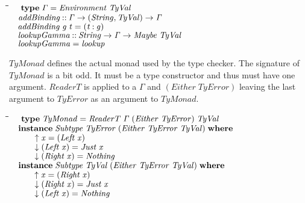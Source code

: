\documentclass[10pt]{article}
\newlength{\lwidth}\setlength{\lwidth}{4.5cm}
\newlength{\cwidth}\setlength{\cwidth}{8mm} %
\newcommand{\Conid}[1]{\mathit{#1}}
\newcommand{\Varid}[1]{\mathit{#1}}
\begin{document}
\begin{tabbing}
\qquad\=\hspace{\lwidth}\=\hspace{\cwidth}\=\+\kill
${\hskip1.00em\relax\mathbf{type}\;\Varid{\Gamma}\mathrel{=}\Conid{Environment}\;\Conid{TyVal}}$\\
${}$\\
${\hskip1.00em\relax\Varid{addBinding}\mathbin{::}\Varid{\Gamma}\to (\Conid{String},\Conid{TyVal})\to \Varid{\Gamma}}$\\
${\hskip1.00em\relax\Varid{addBinding}\;\Varid{g}\;\Varid{t}\mathrel{=}(\Varid{t}\mathbin{:}\Varid{g})}$\\
${}$\\
${\hskip1.00em\relax\Varid{lookupGamma}\mathbin{::}\Conid{String}\to \Varid{\Gamma}\to \Conid{Maybe}\;\Conid{TyVal}}$\\
${\hskip1.00em\relax\Varid{lookupGamma}\mathrel{=}\Varid{lookup}}$
\end{tabbing}
\ensuremath{\Conid{TyMonad}} defines the actual monad used by the type checker.  The
signature of \ensuremath{\Conid{TyMonad}} is a bit odd.  It must be a type constructor
and thus must have one argument.  \ensuremath{\Conid{ReaderT}} is applied to a \ensuremath{\Varid{\Gamma}}
and \ensuremath{(\Conid{Either}\;\Conid{TyError})} leaving the last argument to \ensuremath{\Conid{TyError}} as an
argument to \ensuremath{\Conid{TyMonad}}.

\begin{tabbing}
\qquad\=\hspace{\lwidth}\=\hspace{\cwidth}\=\+\kill
${\hskip1.00em\relax\mathbf{type}\;\Conid{TyMonad}\mathrel{=}\Conid{ReaderT}\;\Varid{\Gamma}\;(\Conid{Either}\;\Conid{TyError})\;\Conid{TyVal}}$\\
${}$\\
${\hskip1.00em\relax\mathbf{instance}\;\Conid{Subtype}\;\Conid{TyError}\;(\Conid{Either}\;\Conid{TyError}\;\Conid{TyVal})\;\mathbf{where}}$\\
${\hskip1.00em\relax\hskip2.00em\relax\Varid{\uparrow}\;\Varid{x}\mathrel{=}(\Conid{Left}\;\Varid{x})}$\\
${\hskip1.00em\relax\hskip2.00em\relax\Varid{\downarrow}\;(\Conid{Left}\;\Varid{x})\mathrel{=}\Conid{Just}\;\Varid{x}}$\\
${\hskip1.00em\relax\hskip2.00em\relax\Varid{\downarrow}\;(\Conid{Right}\;\Varid{x})\mathrel{=}\Conid{Nothing}}$\\
${}$\\
${\hskip1.00em\relax\mathbf{instance}\;\Conid{Subtype}\;\Conid{TyVal}\;(\Conid{Either}\;\Conid{TyError}\;\Conid{TyVal})\;\mathbf{where}}$\\
${\hskip1.00em\relax\hskip2.00em\relax\Varid{\uparrow}\;\Varid{x}\mathrel{=}(\Conid{Right}\;\Varid{x})}$\\
${\hskip1.00em\relax\hskip2.00em\relax\Varid{\downarrow}\;(\Conid{Right}\;\Varid{x})\mathrel{=}\Conid{Just}\;\Varid{x}}$\\
${\hskip1.00em\relax\hskip2.00em\relax\Varid{\downarrow}\;(\Conid{Left}\;\Varid{x})\mathrel{=}\Conid{Nothing}}$
\end{tabbing}
\end{document}
